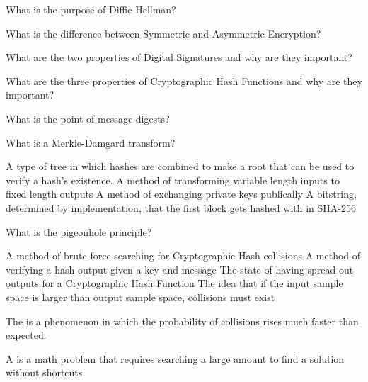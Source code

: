 \documentclass{exam}
\begin{document}
\begin{questions}

  \question[5] 
  What is the purpose of Diffie-Hellman?
  \fillwithlines{.75in}

  \question[5]
  What is the difference between Symmetric and Asymmetric Encryption?
  \fillwithlines{.75in}

  \question[15]
  What are the two properties of Digital Signatures and why are they important?
  \fillwithlines{1in}


  \clearpage


  \question[15]
  What are the three properties of Cryptographic Hash Functions and why are they important?
  \fillwithlines{1in}

  \question[10]
  What is the point of message digests?
  \fillwithlines{.5in}

  \question[2]
  What is a Merkle-Damgard transform?
  \begin{choices}
    \choice A type of tree in which hashes are combined to make a root that can be used to verify
    a hash's existence.
    \choice A method of transforming variable length inputs to fixed length outputs
    \choice A method of exchanging private keys publically
    \choice A bitstring, determined by implementation, that the first block gets hashed with in SHA-256
  \end{choices}

  \question[2]
  What is the pigeonhole principle?
  \begin{choices}
    \choice A method of brute force searching for Cryptographic Hash collisions
    \choice A method of verifying a hash output given a key and message
    \choice The state of having spread-out outputs for a Cryptographic Hash Function
    \choice The idea that if the input sample space is larger than output sample space, collisions must exist
  \end{choices}

  \question[2] The  is a phenomenon in which the probability of collisions rises much faster than expected.
    
  \question[2] A  is a math problem that requires searching a large amount to find a solution without shortcuts


\end{questions}
\end{document}
